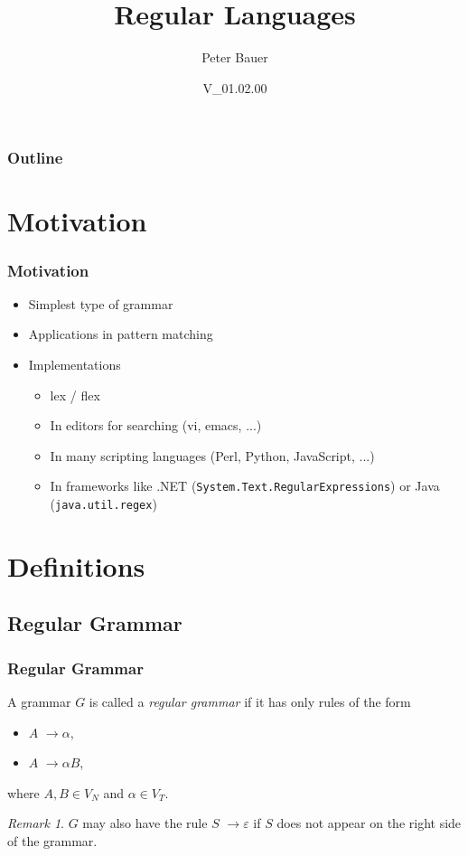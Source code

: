 \documentclass{beamer}
\title{Regular Languages}
\author{Peter Bauer}
\date{V\_01.02.00}
\theoremstyle{remark}
\newtheorem{remark}[theorem]{Remark}
\newcommand{\rewritten}{$\to$}
\begin{document}
\frame{\titlepage}

\begin{frame}
	\frametitle{Outline}
	\tableofcontents
\end{frame}

\section {Motivation}
\begin{frame}
	\frametitle{Motivation}
	
	\begin{itemize}
		\item Simplest type of grammar
		\item Applications in pattern matching
		\item Implementations
		\begin{itemize}
			\item lex / flex
			\item In editors for searching (vi, emacs, ...)
			\item In many scripting languages (Perl, Python, JavaScript, ...)
			\item In frameworks like .NET ({\tt System.Text.RegularExpressions}) or Java ({\tt java.util.regex})
		\end{itemize}
	\end{itemize}
\end{frame}

\section{Definitions}
\subsection {Regular Grammar}
\begin{frame}
	\frametitle{Regular Grammar}
	\begin{definition}
		A grammar $G$ is called a {\em regular grammar} if it has only rules of the form
		\begin{itemize}
			\item $A$ \rewritten $\alpha$,
			\item $A$ \rewritten $\alpha B$,
		\end{itemize}
		where $A, B \in V_N$ and $\alpha \in V_T$.
	\end{definition}
	
	\pause
	
	\begin{remark}
		$G$ may also have the rule $S$ \rewritten $\varepsilon$ if $S$ does not appear on the right side of the grammar.
	\end{remark}
\end{frame}
\end{document}
